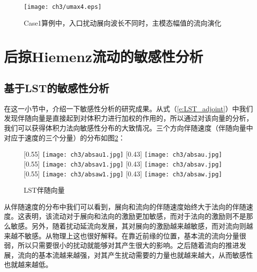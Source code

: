 \begin{figure}
  \centering
  \texttt{[image: ch3/umax4.eps]}\\
  \caption{Case1算例中，入口扰动展向波长不同时，主模态幅值的流向演化}\label{f:findtarget}
\end{figure}
\section{后掠Hiemenz流动的敏感性分析}
\subsection{基于LST的敏感性分析}
在这一小节中，介绍一下敏感性分析的研究成果。从式（\ref{e:LST_adjoint}）中我们发现伴随向量是直接起到对体积力进行加权的作用的，所以通过对该向量的分析，我们可以获得体积力法向敏感性分布的大致情况。三个方向伴随速度（伴随向量中对应于速度的三个分量）的分布如图\ref{f:LST_ADJOINT}：
\begin{figure}[htb]
  \centering
  [0.55\textwidth]
  {\texttt{[image: ch3/absau1.jpg]}}
  [0.43\textwidth]
  {\texttt{[image: ch3/absau.jpg]}}
  \\\bigskip
  [0.55\textwidth]
  {\texttt{[image: ch3/absav1.jpg]}}
  [0.43\textwidth]
  {\texttt{[image: ch3/absav.jpg]}}
  \\\bigskip
  [0.55\textwidth]
  {\texttt{[image: ch3/absaw1.jpg]}}
  [0.43\textwidth]
  {\texttt{[image: ch3/absaw.jpg]}}
  \caption{LST伴随向量}\label{f:LST_ADJOINT}
\end{figure}
从伴随速度的分布中我们可以看到，展向和流向的伴随速度始终大于法向的伴随速度。这表明，该流动对于展向和法向的激励更加敏感，而对于法向的激励则不是那么敏感。另外，随着扰动延流向发展，其对展向的激励越来越敏感，而对流向则越来越不敏感。从物理上这也很好解释。在靠近前缘的位置，基本流的流向分量很弱，所以只需要很小的扰动就能够对其产生很大的影响。之后随着流向的推进发展，流向的基本流越来越强，对其产生扰动需要的力量也就越来越大，从而敏感性也就越来越低。

